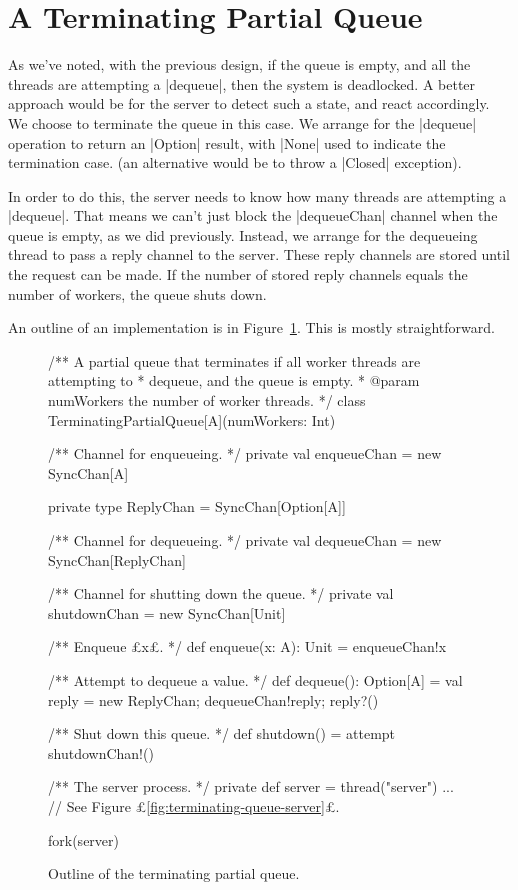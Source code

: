
\section{A Terminating Partial Queue}

As we've noted, with the previous design, if the queue is empty, and all the
threads are attempting a |dequeue|, then the system is deadlocked.
%
A better approach would be for the server to detect such a state, and react
accordingly.  We choose to terminate the queue in this case.  We arrange for
the |dequeue| operation to return an |Option| result, with |None| used to
indicate the termination case.  (an alternative would be to throw a |Closed|
exception).

In order to do this, the server needs to know how many threads are attempting
a |dequeue|.  That means we can't just block the |dequeueChan| channel when
the queue is empty, as we did previously.  Instead, we arrange for the
dequeueing thread to pass a reply channel to the server.  These reply channels
are stored until the request can be made.  If the number of stored reply
channels equals the number of workers, the queue shuts down.

An outline of an implementation is in Figure~\ref{fig:terminating-queue}.
This is mostly straightforward.


\begin{figure}
\begin{scala}
/** A partial queue that terminates if all worker threads are attempting to
  * dequeue, and the queue is empty.
  * @param numWorkers the number of worker threads. */
class TerminatingPartialQueue[A](numWorkers: Int){
  /** Channel for enqueueing. */
  private val enqueueChan = new SyncChan[A]

  private type ReplyChan = SyncChan[Option[A]]

  /** Channel for dequeueing. */
  private val dequeueChan = new SyncChan[ReplyChan]

  /** Channel for shutting down the queue. */
  private val shutdownChan = new SyncChan[Unit]

  /** Enqueue £x£. */
  def enqueue(x: A): Unit = enqueueChan!x

  /** Attempt to dequeue a value. */
  def dequeue(): Option[A] = {
    val reply = new ReplyChan; dequeueChan!reply; reply?()
  }

  /** Shut down this queue. */
  def shutdown() = attempt{ shutdownChan!() }{ }

  /** The server process. */
  private def server = thread("server"){ ... } // See Figure £\ref{fig:terminating-queue-server}£.

  fork(server)
}
\end{scala}
\caption{Outline of the terminating partial queue.}
\label{fig:terminating-queue}
\end{figure}

